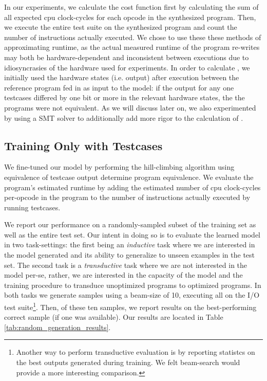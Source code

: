 \documentclass{article}
\begin{document}

In our experiments, we calculate the cost function  first by calculating the sum of all expected cpu clock-cycles for each opcode in the synthesized program. Then, we execute the entire test suite on the synthesized program and count the number of instructions actually executed. We chose to use these these methods of approximating runtime, as the actual measured runtime of the program re-writes may both be hardware-dependent and inconsistent between executions due to idiosyncrasies of the hardware used for experiments. In order to calculate , we initially used the hardware states (i.e. output) after execution between the reference program fed in as input to the model: if the output for any one testcases differed by one bit or more in the relevant hardware states, the the programs were not equivalent. As we will discuss later on, we also experimented by using a SMT solver to additionally add more rigor to the calculation of .  


\subsection{Training Only with Testcases}



We fine-tuned our model by performing the hill-climbing algorithm using equivalence of testcase output determine program equivalence. We evaluate the program's estimated runtime by adding the estimated number of cpu clock-cycles per-opcode in the program to the number of instructions actually executed by running testcases. 

We report our performance on a randomly-sampled subset of the training set as well as the entire test set. Our intent in doing so is to evaluate the learned model in two task-settings: the first being an \textit{inductive} task where we are interested in the model generated and its ability to generalize to unseen examples in the test set. The second task is a \textit{transductive} task where we are not interested in the model per-se, rather, we are interested in the capacity of the model and the training procedure to transduce unoptimized programs to optimized programs. In both tasks we generate samples using a beam-size of 10, executing all on the I/O test suite\footnote{Another way to perform transductive evaluation is by reporting statistcs on the best outputs generated during training. We felt beam-search would provide a more interesting comparison.}. Then, of these ten samples, we report results on the best-performing correct sample (if one was available). Our results are located in Table \ref{tab:random_generation_results}. 
\end{document}

